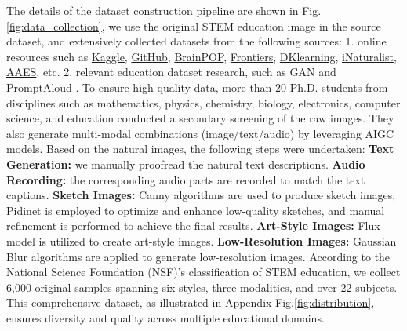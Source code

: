 The details of the dataset construction pipeline are shown in Fig.\ref{fig:data_collection}, we use the original STEM education image in the source dataset, and extensively collected datasets from the following sources: 1. online resources such as \href{https://www.kaggle.com/datasets}{Kaggle}, \href{https://github.com/carbon-app/carbon}{GitHub}, \href{https://jr.brainpop.com/subject/science/}{BrainPOP}, \href{https://keypoint.keystonesymposia.org/}{Frontiers}, \href{https://learning.dk.com/us}{DKlearning}, \href{https://www.inaturalist.org/}{iNaturalist}, \href{https://www.asiastem.org/steam-free-resources}{AAES}, etc. 2. relevant education dataset research, such as GAN \cite{jin2023gan} and PromptAloud \cite{lee2024prompt}. To ensure high-quality data, more than 20 Ph.D. students from disciplines such as mathematics, physics, chemistry, biology, electronics, computer science, and education conducted a secondary screening of the raw images. They also generate multi-modal combinations (image/text/audio) by leveraging AIGC models.
Based on the natural images, the following steps were undertaken:
{\bf Text Generation:} we manually proofread the natural text descriptions.
{\bf Audio Recording:} the corresponding audio parts are recorded to match the text captions.
{\bf Sketch Images:} Canny algorithms are used to produce sketch images, Pidinet \cite{pdc} is employed to optimize and enhance low-quality sketches, and manual refinement is performed to achieve the final results.
{\bf Art-Style Images:} Flux model \cite{flux} is utilized to create art-style images.
{\bf Low-Resolution Images:} Gaussian Blur algorithms are applied to generate low-resolution images.
According to the National Science Foundation (NSF)’s classification of STEM education, we collect 6,000 original samples spanning six styles, three modalities, and over 22 subjects. This comprehensive dataset, as illustrated in Appendix Fig.\ref{fig:distribution}, ensures diversity and quality across multiple educational domains.



